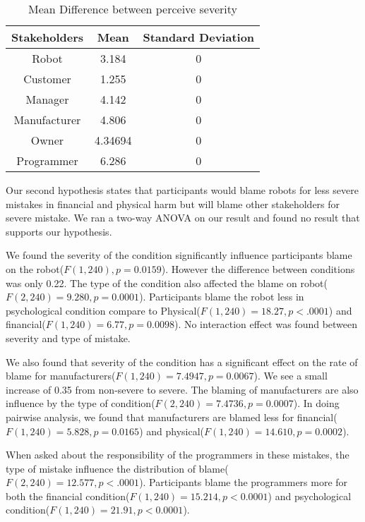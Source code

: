 \documentclass{sigchi}
\begin{document}
\begin{table}[h]
  \centering
  \begin{tabular}{|c|c|c|}
    \hline
    Stakeholders & Mean & Standard Deviation\\
    \hline
    Robot & 3.184 & 0\\
    \hline
    Customer & 1.255 & 0\\
    \hline
    Manager & 4.142 & 0 \\
    \hline
    Manufacturer & 4.806 & 0 \\
    \hline
    Owner & 4.34694 & 0 \\
    \hline
    Programmer & 6.286 & 0 \\
    \hline
  \end{tabular}
  \caption{Mean Difference between perceive severity}
  \label{tab:table2}
\end{table}

Our second hypothesis states that participants would blame robots for less severe mistakes in financial and physical harm but will blame other stakeholders for severe mistake. We ran a two-way ANOVA on our result and found no result that supports our hypothesis.


We found the severity of the condition significantly influence participants blame on the robot($F(1,240), p = 0.0159$). However the difference between conditions was only 0.22. The type of the condition also affected the blame on robot($F(2,240)=9.280, p = 0.0001$). Participants blame the robot less in psychological condition compare to Physical($F(1,240)=18.27, p < .0001$) and financial($F(1,240)=6.77, p = 0.0098$). No interaction effect was found between severity and type of mistake.

We also found that severity of the condition has a significant effect on the rate of blame for manufacturers($F(1,240)=7.4947, p = 0.0067$). We see a small increase of 0.35 from non-severe to severe. The blaming of manufacturers are also influence by the type of condition($F(2,240)=7.4736, p=0.0007$). In doing pairwise analysis, we found that manufacturers are blamed less for financial($F(1,240)=5.828, p = 0.0165$) and physical($F(1,240)=14.610, p = 0.0002$).

When asked about the responsibility of the programmers in these mistakes, the type of mistake influence the distribution of blame($F(2,240)=12.577, p < .0001$). Participants blame the programmers more for both the financial condition($F(1,240)=15.214, p < 0.0001$) and psychological condition($F(1,240)=21.91, p < 0.0001$).
\end{document}

